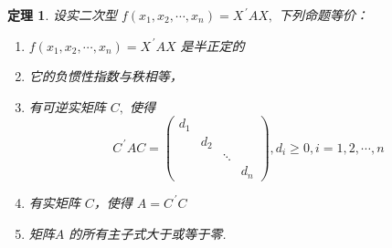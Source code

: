 \documentclass[13pt]{beamer}
\newtheorem{thm}{定理}
\begin{document}
\begin{frame}
\begin{thm}
设实二次型 $f\left(x_{1}, x_{2}, \cdots, x_{n}\right)=X^{\,\prime} A X,$ 下列命题等价：
\begin{enumerate}
	\item $f\left(x_{1}, x_{2}, \cdots, x_{n}\right)=X^{\, \prime} A X$ 是半正定的
	\item 它的负惯性指数与秩相等，
	\item 有可逆实矩阵 $C,$ 使得
\[
C^{\, \prime} A C=\left(\begin{array}{cccc}
d_{1} & & & \\
& d_{2} & & \\
& & \ddots & \\
& & & d_{n}
\end{array}\right), d_{i} \geq 0, i=1,2, \cdots, n
\]
	\item 有实矩阵 $C$，使得 $A=C^{\, \prime} C$
 	\item 矩阵$A$ 的所有主子式大于或等于零.
\end{enumerate}
\end{thm}
\end{frame}
\end{document}

